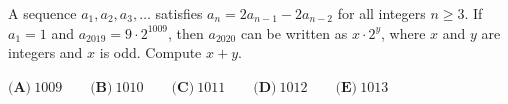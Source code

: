 A sequence $a_1,a_2,a_3,\dots$ satisfies $a_n=2a_{n-1}-2a_{n-2}$ for all integers $n\ge3$. If $a_1=1$ and $a_{2019}=9\cdot2^{1009}$, then $a_{2020}$ can be written as $x\cdot2^{y}$, where $x$ and $y$ are integers and $x$ is odd. Compute $x+y$.

$\textbf{(A)}\ 1009 \qquad \textbf{(B)}\ 1010 \qquad \textbf{(C)}\ 1011 \qquad \textbf{(D)}\ 1012 \qquad \textbf{(E)}\ 1013$
